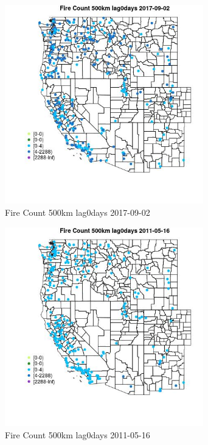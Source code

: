 \begin{figure} 
\centering  
\includegraphics[width=0.77\textwidth]{Code_Outputs/Report_ML_input_PM25_Step4_part_e_de_duplicated_aves_compiled_2019-05-21wNAs_MapObsFire_Count_500km_lag0days2017-09-02.jpg} 
\caption{\label{fig:Report_ML_input_PM25_Step4_part_e_de_duplicated_aves_compiled_2019-05-21wNAsMapObsFire_Count_500km_lag0days2017-09-02}Fire Count 500km lag0days 2017-09-02} 
\end{figure} 
 

\begin{figure} 
\centering  
\includegraphics[width=0.77\textwidth]{Code_Outputs/Report_ML_input_PM25_Step4_part_e_de_duplicated_aves_compiled_2019-05-21wNAs_MapObsFire_Count_500km_lag0days2011-05-16.jpg} 
\caption{\label{fig:Report_ML_input_PM25_Step4_part_e_de_duplicated_aves_compiled_2019-05-21wNAsMapObsFire_Count_500km_lag0days2011-05-16}Fire Count 500km lag0days 2011-05-16} 
\end{figure} 
 

